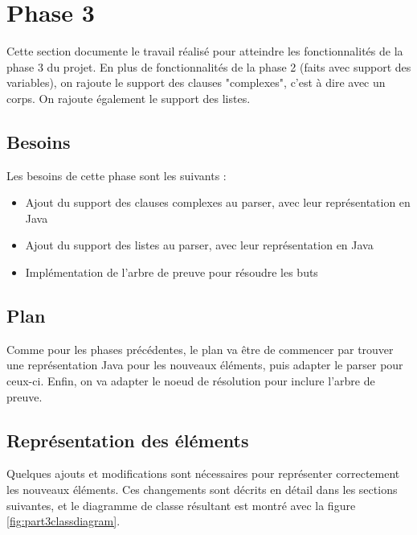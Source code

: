 \documentclass[../report.tex]{subfiles}
\begin{document}
\section{Phase 3}
Cette section documente le travail réalisé pour atteindre les fonctionnalités de la phase 3 du projet. En plus de fonctionnalités de la phase 2 (faits avec support des variables), on rajoute le support des clauses "complexes", c'est à dire avec un corps. On rajoute également le support des listes.
\subsection{Besoins}
Les besoins de cette phase sont les suivants :
\begin{itemize}
    \item Ajout du support des clauses complexes au parser, avec leur représentation en Java 
    \item Ajout du support des listes au parser, avec leur représentation en Java
    \item Implémentation de l'arbre de preuve pour résoudre les buts
\end{itemize}
\subsection{Plan}
Comme pour les phases précédentes, le plan va être de commencer par trouver une représentation Java pour les nouveaux éléments, puis adapter le parser pour ceux-ci. Enfin, on va adapter le noeud de résolution pour inclure l'arbre de preuve.
\subsection{Représentation des éléments}
Quelques ajouts et modifications sont nécessaires pour représenter correctement les nouveaux éléments. Ces changements sont décrits en détail dans les sections suivantes, et le diagramme de classe résultant est montré avec la figure \ref{fig:part3classdiagram}.
\end{document}
